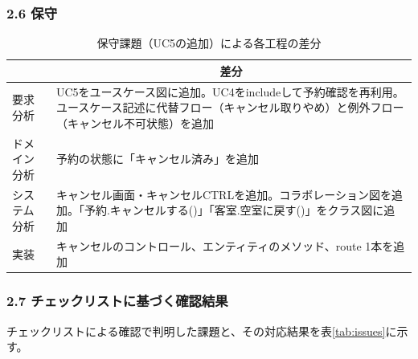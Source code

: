 \documentclass[xelatex,ja=standard,a4paper,12pt]{bxjsarticle}
\begin{document}
\subsubsection*{2.6 保守}


\begin{table}[H]
    \centering
    \caption{保守課題（UC5の追加）による各工程の差分}
    \label{tab:maintenance-diff}

    \renewcommand{\arraystretch}{1.4}

    \begin{tabularx}{\linewidth}{
        |>{\centering\arraybackslash}p{2.6cm}
        |X|
    }
        \hline
        \multicolumn{1}{|c|}{工程} & \multicolumn{1}{c|}{差分} \\
        \hline

        要求分析
        & UC5をユースケース図に追加。UC4をincludeして予約確認を再利用。ユースケース記述に代替フロー（キャンセル取りやめ）と例外フロー（キャンセル不可状態）を追加 \\
        \hline

        ドメイン分析
        & 予約の状態に「キャンセル済み」を追加 \\
        \hline

        システム分析
        & キャンセル画面・キャンセルCTRLを追加。コラボレーション図を追加。「予約.キャンセルする()」「客室.空室に戻す()」をクラス図に追加 \\
        \hline

        実装
        & キャンセルのコントロール、エンティティのメソッド、route 1本を追加 \\
        \hline
    \end{tabularx}
\end{table}

\subsubsection*{2.7 チェックリストに基づく確認結果}


チェックリストによる確認で判明した課題と、その対応結果を表\ref{tab:issues}に示す。
\end{document}

